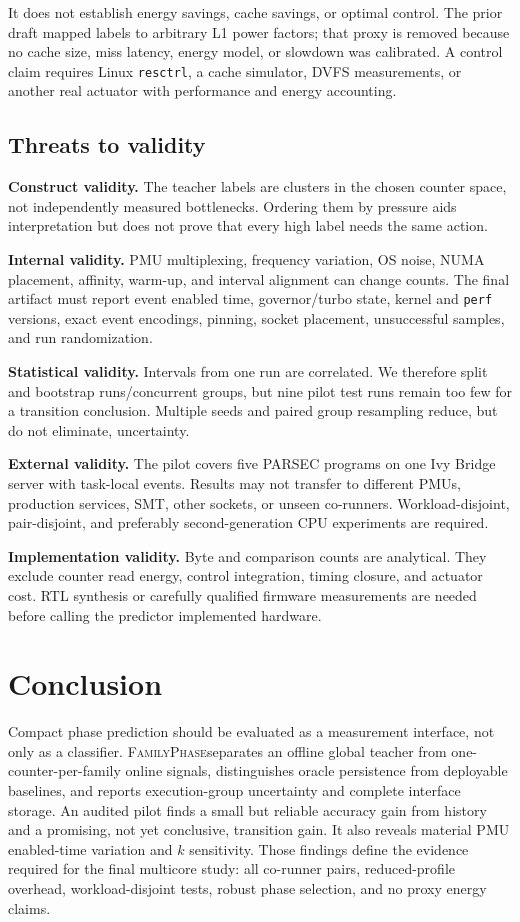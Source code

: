 \documentclass[conference,10pt]{IEEEtran}
\newcommand{\system}{\textsc{FamilyPhase}}
\begin{document}
It does not establish energy savings, cache savings, or optimal control. The prior
draft mapped labels to arbitrary L1 power factors; that proxy is removed because no
cache size, miss latency, energy model, or slowdown was calibrated. A control claim
requires Linux \texttt{resctrl}, a cache simulator, DVFS measurements, or another real
actuator with performance and energy accounting.

\subsection{Threats to validity}

\textbf{Construct validity.} The teacher labels are clusters in the chosen counter
space, not independently measured bottlenecks. Ordering them by pressure aids
interpretation but does not prove that every high label needs the same action.

\textbf{Internal validity.} PMU multiplexing, frequency variation, OS noise, NUMA
placement, affinity, warm-up, and interval alignment can change counts. The final
artifact must report event enabled time, governor/turbo state, kernel and \texttt{perf}
versions, exact event encodings, pinning, socket placement, unsuccessful samples, and
run randomization.

\textbf{Statistical validity.} Intervals from one run are correlated. We therefore
split and bootstrap runs/concurrent groups, but nine pilot test runs remain too few for
a transition conclusion. Multiple seeds and paired group resampling reduce, but do not
eliminate, uncertainty.

\textbf{External validity.} The pilot covers five PARSEC programs on one Ivy Bridge
server with task-local events. Results may not transfer to different PMUs, production
services, SMT, other sockets, or unseen co-runners. Workload-disjoint, pair-disjoint,
and preferably second-generation CPU experiments are required.

\textbf{Implementation validity.} Byte and comparison counts are analytical. They
exclude counter read energy, control integration, timing closure, and actuator cost.
RTL synthesis or carefully qualified firmware measurements are needed before calling
the predictor implemented hardware.

\section{Conclusion}

Compact phase prediction should be evaluated as a measurement interface, not only as
a classifier. \system separates an offline global teacher from one-counter-per-family
online signals, distinguishes oracle persistence from deployable baselines, and reports
execution-group uncertainty and complete interface storage. An audited pilot finds a
small but reliable accuracy gain from history and a promising, not yet conclusive,
transition gain. It also reveals material PMU enabled-time variation and $k$ sensitivity. Those
findings define the evidence required for the final multicore study: all co-runner
pairs, reduced-profile overhead, workload-disjoint tests, robust phase selection, and
no proxy energy claims.



\end{document}
